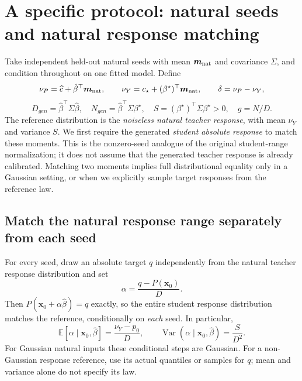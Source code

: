 \documentclass[11pt]{article}
\newcommand{\E}{\mathbb E}
\newcommand{\Var}{\operatorname{Var}}
\newcommand{\bstar}{{\beta^{\star}}}
\newcommand{\bhat}{\hat{\beta}}
\newcommand{\x}{\mathbf{x}}
\begin{document}
\section{A specific protocol: natural seeds and natural response matching}
\label{sec:natural-matching}
Take independent held-out natural seeds with mean $\bm m_{\rm nat}$ and
covariance $\Sigma$, and condition throughout on one fitted model. Define
\[
 \nu_P=\widehat c+\bhat^\top\bm m_{\rm nat},\qquad
 \nu_Y=c_\star+(\bstar)^\top\bm m_{\rm nat},\qquad
 \delta=\nu_P-\nu_Y,
\]
\[
 D_{gen}=\bhat^\top\Sigma\bhat,\quad N_{gen}=\bhat^\top\Sigma\bstar,\quad
 S=(\bstar)^\top\Sigma\bstar>0,\quad g=N/D.
\]
The reference distribution is the \emph{noiseless natural teacher response},
with mean $\nu_Y$ and variance $S$. We first require the generated
\emph{student absolute response} to match these moments. This is the
nonzero-seed analogue of the original student-range normalization; it does
not assume that the generated teacher response is already calibrated.
Matching two moments implies full distributional equality only in a Gaussian
setting, or when we explicitly sample target responses from the reference law.

\subsection{Match the natural response range separately from each seed}
For every seed, draw an absolute target $q$ independently from the natural
teacher response distribution and set
\begin{equation}\boxed{
 \alpha=\frac{q-P(\x_0)}{D}.}
 \label{eq:matching-target}
\end{equation}
Then $P(\x_0+\alpha\bhat)=q$ exactly, so the entire student response
distribution matches the reference, conditionally on \emph{each} seed.
In particular,
\begin{equation}\boxed{
 \E[\alpha\mid\x_0,\bhat]=\frac{\nu_Y-p_0}{D},\qquad
 \Var(\alpha\mid\x_0,\bhat)=\frac{S}{D^2}.}
 \label{eq:matching-conditional}
\end{equation}
For Gaussian natural inputs these conditional steps are Gaussian. For a
non-Gaussian response reference, use its actual quantiles or samples for $q$;
mean and variance alone do not specify its law.
\end{document}
